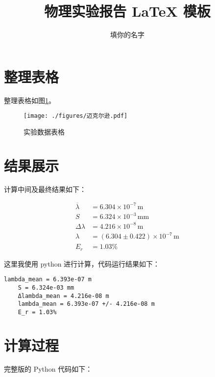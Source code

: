 \documentclass[12pt]{article}
\title{物理实验报告 \LaTeX{} 模板}%
\author{填你的名字}
\begin{document}
\maketitle

\section{\normalfont 整理表格}

整理表格如图\ref{fig:table_data}。

\begin{figure}[H] %
    \centering
    \texttt{[image: ./figures/迈克尔逊.pdf]} 
    \caption{实验数据表格}
    \label{fig:table_data}
\end{figure}

\section{\normalfont 结果展示}


计算中间及最终结果如下：

\begin{align*}
\overline{\lambda} &= 6.304 \times 10^{-7} \, \text{m} \\
S &= 6.324 \times 10^{-3} \, \text{mm} \\
\Delta \lambda &= 4.216 \times 10^{-8} \, \text{m} \\
\lambda &= (6.304 \pm 0.422) \times 10^{-7} \, \text{m}\\
E_r &= 1.03\%
\end{align*}

这里我使用 python 进行计算，代码运行结果如下：

\begin{Verbatim}[frame=single, fontsize=\small]
    lambda_mean = 6.393e-07 m
    S = 6.324e-03 mm
    Δlambda_mean = 4.216e-08 m
    lambda_mean = 6.393e-07 +/- 4.216e-08 m
    E_r = 1.03%
\end{Verbatim}

\section{\normalfont 计算过程}


完整版的 Python 代码如下：
\end{document}
